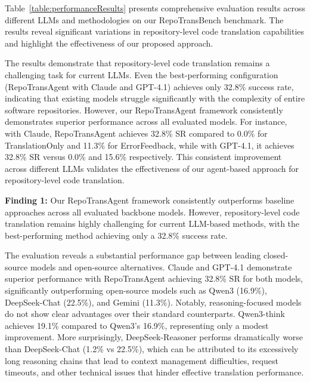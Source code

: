 
Table~\ref{table:performanceResults} presents comprehensive evaluation results across different LLMs and methodologies on our RepoTransBench benchmark. The results reveal significant variations in repository-level code translation capabilities and highlight the effectiveness of our proposed approach.

The results demonstrate that repository-level code translation remains a challenging task for current LLMs. Even the best-performing configuration (RepoTransAgent with Claude and GPT-4.1) achieves only 32.8\% success rate, indicating that existing models struggle significantly with the complexity of entire software repositories. However, our RepoTransAgent framework consistently demonstrates superior performance across all evaluated models. For instance, with Claude, RepoTransAgent achieves 32.8\% SR compared to 0.0\% for TranslationOnly and 11.3\% for ErrorFeedback, while with GPT-4.1, it achieves 32.8\% SR versus 0.0\% and 15.6\% respectively. This consistent improvement across different LLMs validates the effectiveness of our agent-based approach for repository-level code translation.

\begin{myboxc} \textbf{Finding 1: }
Our RepoTransAgent framework consistently outperforms baseline approaches across all evaluated backbone models.
However, repository-level code translation remains highly challenging for current LLM-based methods, with the best-performing method achieving only a 32.8\% success rate. 
\end{myboxc}

The evaluation reveals a substantial performance gap between leading closed-source models and open-source alternatives. Claude and GPT-4.1 demonstrate superior performance with RepoTransAgent achieving 32.8\% SR for both models, significantly outperforming open-source models such as Qwen3 (16.9\%), DeepSeek-Chat (22.5\%), and Gemini (11.3\%). Notably, reasoning-focused models do not show clear advantages over their standard counterparts. Qwen3-think achieves 19.1\% compared to Qwen3's 16.9\%, representing only a modest improvement. More surprisingly, DeepSeek-Reasoner performs dramatically worse than DeepSeek-Chat (1.2\% vs 22.5\%), which can be attributed to its excessively long reasoning chains that lead to context management difficulties, request timeouts, and other technical issues that hinder effective translation performance.

